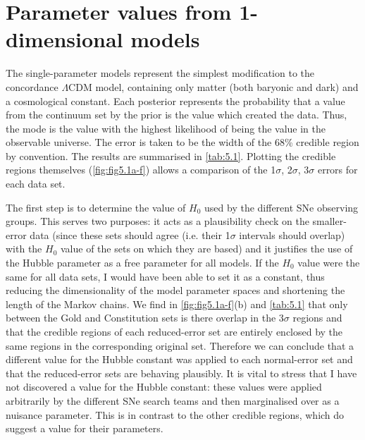 \section{Parameter values from 1-dimensional models}
\label{sec:5.1}

\begin{figure}
\centering
{}
\end{figure}

The single-parameter models represent the simplest modification to the concordance $\Lambda$CDM model, containing only matter (both baryonic and dark) and a cosmological constant. Each posterior represents the probability that a value from the continuum set by the prior is the value which created the data. Thus, the mode is the value with the highest likelihood of being the value in the observable universe. The error is taken to be the width of the 68\% credible region by convention. The results are summarised in \cref{tab:5.1}. Plotting the credible regions themselves (\cref{fig:fig5.1a-f}) allows a comparison of the 1$\sigma$, 2$\sigma$, 3$\sigma$ errors for each data set.
   
The first step is to determine the value of $H_0$ used by the different SNe observing groups. This serves two purposes: it acts as a plausibility check on the smaller-error data (since these sets should agree (i.e. their 1$\sigma$ intervals should overlap) with the $H_0$ value of the sets on which they are based) and it justifies the use of the Hubble parameter as a free parameter for all models. If the $H_0$ value were the same for all data sets, I would have been able to set it as a constant, thus reducing the dimensionality of the model parameter spaces and shortening the length of the Markov chains. We find in \cref{fig:fig5.1a-f}(b) and \cref{tab:5.1} that only between the Gold and Constitution sets is there overlap in the 3$\sigma$ regions and that the credible regions of each reduced-error set are entirely enclosed by the same regions in the corresponding original set. Therefore we can conclude that a different value for the Hubble constant was applied to each normal-error set and that the reduced-error sets are behaving plausibly. It is vital to stress that I have not discovered a value for the Hubble constant: these values were applied arbitrarily by the different SNe search teams and then marginalised over as a nuisance parameter. This is in contrast to the other credible regions, which do suggest a value for their parameters.

